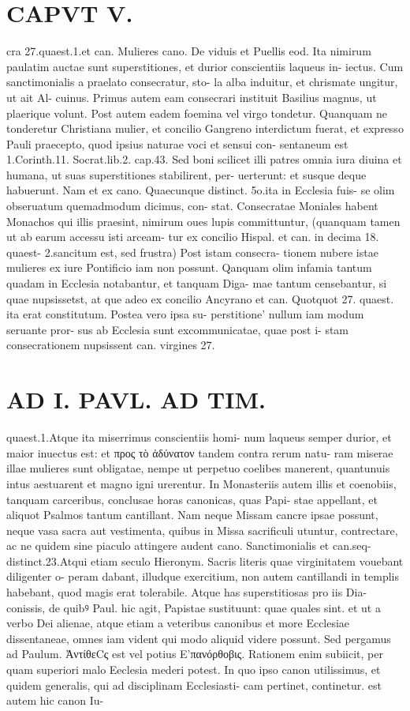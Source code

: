 \documentclass{article}
\begin{document}
\begin{pages}
\section*{CAPVT V. }
\marginpar{[ p.295 ]}cra 27.quaest.1.et can. Mulieres cano. De viduis et Puellis eod. Ita nimirum paulatim auctae sunt superstitiones, et durior conscientiis laqueus in- iectus. Cum sanctimonialis a praelato consecratur, sto- la alba induitur, et chrismate ungitur, ut ait Al- cuinus. Primus autem eam consecrari instituit Basilius magnus, ut plaerique volunt. Post autem eadem foemina vel virgo tondetur. Quanquam ne tonderetur Christiana mulier, et concilio Gangreno interdictum fuerat, et expresso Pauli praecepto, quod ipsius naturae voci et sensui con- sentaneum est 1.Corinth.11. Socrat.lib.2. cap.43. Sed boni scilicet illi patres omnia iura diuina et humana, ut suas superstitiones stabilirent, per- uerterunt: et susque deque habuerunt. Nam et ex cano. Quaecunque distinct. 5o.ita in Ecclesia fuis- se olim obseruatum quemadmodum dicimus, con- stat. Consecratae Moniales habent Monachos qui illis praesint, nimirum oues lupis committuntur, (quanquam tamen ut ab earum accessu isti arceam- tur ex concilio Hispal. et can. in decima 18. quaest- 2.sancitum est, sed frustra) Post istam consecra- tionem nubere istae mulieres ex iure Pontificio iam non possunt. Qanquam olim infamia tantum quadam in Ecclesia notabantur, et tanquam Diga- mae tantum censebantur, si quae nupsissetst, at que adeo ex concilio Ancyrano et can. Quotquot 27. quaest. ita erat constitutum. Postea vero ipsa su- perstitione' nullum iam modum seruante pror- sus ab Ecclesia sunt excommunicatae, quae post i- stam consecrationem nupsissent can. virgines 27. 
\section*{AD I. PAVL. AD TIM. }
\marginpar{[ p.296 ]}quaest.1.Atque ita miserrimus conscientiis homi- num laqueus semper durior, et maior inuectus est: et προς τὸ ἀδύνατον tandem contra rerum natu- ram miserae illae mulieres sunt obligatae, nempe ut perpetuo coelibes manerent, quantunuis intus aestuarent et magno igni urerentur. In Monasteriis autem illis et coenobiis, tanquam carceribus, conclusae horas canonicas, quas Papi- stae appellant, et aliquot Psalmos tantum cantillant. Nam neque Missam cancre ipsae possunt, neque vasa sacra aut vestimenta, quibus in Missa sacrificuli utuntur, contrectare, ac ne quidem sine piaculo attingere audent cano. Sanctimonialis et can.seq- distinct.23.Atqui etiam seculo Hieronym. Sacris literis quae virginitatem vouebant diligenter o- peram dabant, illudque exercitium, non autem cantillandi in templis habebant, quod magis erat tolerabile. Atque has superstitiosas pro iis Dia- conissis, de quibꝰ Paul. hic agit, Papistae sustituunt: quae quales sint. et ut a verbo Dei alienae, atque etiam a veteribus canonibus et more Ecclesiae dissentaneae, omnes iam vident qui modo aliquid videre possunt. Sed pergamus ad Paulum.    ἈντίθεCς est vel potius Ε’πανόρθοβις. Rationem enim subiicit, per quam superiori malo Eeclesia mederi potest. In quo ipso canon utilissimus, et quidem generalis, qui ad disciplinam Ecclesiasti- cam pertinet, continetur. est autem hic canon Iu- 

\end{pages}
\end{document}
